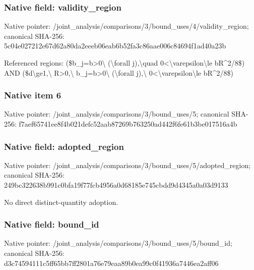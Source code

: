 \documentclass[10pt,a4paper]{article}
\begin{document}
\subsubsection{Native field: validity\_\allowbreak{}region}
Native pointer: /joint\_\allowbreak{}analysis/comparisons/3/bound\_\allowbreak{}uses/4/validity\_\allowbreak{}region; canonical SHA-256: 5c04e027212e67d62a80da2eeeb06eab6b52fa3c86aae006c84694f1ad40a23b

\begingroup\raggedright\sloppy Referenced regions:\allowbreak{} (\$b\_\allowbreak{}j=\allowbreak{}b>0\textbackslash{} (\textbackslash{}forall j),\allowbreak{}\textbackslash{}quad 0<\textbackslash{}varepsilon\textbackslash{}le bR\textasciicircum{}2/\allowbreak{}8\$) AND (\$d\textbackslash{}ge1,\allowbreak{}\textbackslash{} R>0,\allowbreak{}\textbackslash{} b\_\allowbreak{}j=\allowbreak{}b>0\textbackslash{} (\textbackslash{}forall j),\allowbreak{}\textbackslash{} 0<\textbackslash{}varepsilon\textbackslash{}le bR\textasciicircum{}2/\allowbreak{}8\$)\par\endgroup

\subsubsection{Native item 6}
Native pointer: /joint\_\allowbreak{}analysis/comparisons/3/bound\_\allowbreak{}uses/5; canonical SHA-256: f7aef65741ee8f4b021defc52aab87269b763250ad442f6fe61b3be017516a4b

\subsubsection{Native field: adopted\_\allowbreak{}region}
Native pointer: /joint\_\allowbreak{}analysis/comparisons/3/bound\_\allowbreak{}uses/5/adopted\_\allowbreak{}region; canonical SHA-256: 249bc322638b991c0bfa19f77fcb4956a0d68185e745cbdd9d4345a0a03d9133

\begingroup\raggedright\sloppy No direct distinct-quantity adoption.\par\endgroup

\subsubsection{Native field: bound\_\allowbreak{}id}
Native pointer: /joint\_\allowbreak{}analysis/comparisons/3/bound\_\allowbreak{}uses/5/bound\_\allowbreak{}id; canonical SHA-256: d3c74594111c5ff65bb7ff2801a76e79eaa89b0ea99c0f41936a7446ea2aff06
\end{document}
